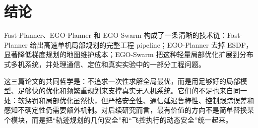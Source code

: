 \documentclass[UTF8,a4paper,12pt]{ctexart}
\begin{document}
\section{结论}

Fast-Planner、EGO-Planner 和 EGO-Swarm 构成了一条清晰的技术链：Fast-Planner 给出高速单机局部规划的完整工程 pipeline；EGO-Planner 去掉 ESDF，显著降低梯度规划的地图维护成本；EGO-Swarm 把这种轻量局部优化扩展到分布式多机系统，并处理通信、定位和真实实验中的一部分工程问题。

这三篇论文的共同哲学是：不追求一次性求解全局最优，而是用足够好的局部模型、足够快的优化和频繁重规划来支撑真实无人机系统。它们的不足也来自同一处：软惩罚和局部优化虽然快，但严格安全性、通信延迟鲁棒性、控制跟踪误差和感知不确定性仍需要额外机制。对后续研究而言，最有价值的方向不是简单替换某个模块，而是把“轨迹规划的几何安全”和“飞控执行的动态安全”统一起来。
\end{document}
